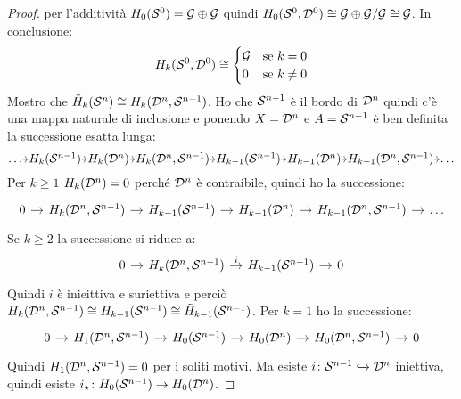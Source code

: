 \begin{proof}
  per l'additività $ H_0(\mathcal{S}^{0}) = \mathcal{G} \oplus \mathcal{G} $ quindi
  $ H_0(\mathcal{S}^{0}, \mathcal{D}^{0}) \cong {\mathcal{G} \oplus \mathcal{G}} \slash {\mathcal{G}} \cong \mathcal{G} $.
  In conclusione:
  \[
    H_k(\mathcal{S}^{0}, \mathcal{D}^{0}) \cong
    \begin{cases}
      \mathcal{G} & \text{se } k = 0 \\
      0 & \text{se } k \not =  0
    \end{cases}
  \]
  Mostro che $ \tilde{H}_k(\mathcal{S}^{n}) \cong H_k(\mathcal{D}^{n}, \mathcal{S}^{n-1}) $.
  Ho che $ \mathcal{S}^{n-1} $ è il bordo di $ \mathcal{D}^{n} $ quindi c'è una mappa naturale di inclusione
  e ponendo $ X = \mathcal{D}^{n} $ e $ A = \mathcal{S}^{n-1} $ è ben definita la successione esatta lunga:
  \[
    \begin{tikzcd}[nodes={column sep=4.5pt, inner sep=0.5pt}]
      \dots \rar & H_k(\Sph{n-1}) \rar & H_k(\Disk{n}) \rar & H_k(\Disk{n}, \Sph{n-1}) \rar
      & H_{k-1}(\Sph{n-1}) \rar & H_{k-1}(\Disk{n}) \rar & H_{k-1}(\Disk{n}, \Sph{n-1}) \rar & \dots
    \end{tikzcd}
  \]
  Per $ k \geq 1 $ $ H_k(\mathcal{D}^{n}) = 0 $ perché $ \mathcal{D}^{n} $ è contraibile, quindi ho la successione:
  \[
    \begin{tikzcd}[nodes={column sep=10pt}]
      0 \rar & H_k(\Disk{n}, \Sph{n-1}) \rar & H_{k-1}(\Sph{n-1}) \rar & H_{k-1}(\Disk{n}) \rar & H_{k-1}(\Disk{n}, \Sph{n-1}) \rar & \dots
    \end{tikzcd}
  \]
  Se $ k \geq 2 $ la successione si riduce a:
  \[
    \begin{tikzcd}[nodes={column sep=10pt}]
      0 \rar & H_k(\Disk{n}, \Sph{n-1}) \rar{i} & H_{k-1}(\Sph{n-1}) \rar & 0
    \end{tikzcd}
  \]
  Quindi $ i $ è inieittiva e suriettiva e perciò
  $ H_k(\mathcal{D}^{n}, \mathcal{S}^{n-1}) \cong H_{k-1}(\mathcal{S}^{n-1}) \cong \tilde{H}_{k-1}(\mathcal{S}^{n-1}) $.
  Per $ k = 1 $ ho la successione:
  \[
    \begin{tikzcd}[nodes={column sep=10pt}]
      0 \rar & H_1(\Disk{n}, \Sph{n-1}) \rar & H_0(\Sph{n-1}) \rar & H_0(\Disk{n}) \rar & H_0(\Disk{n}, \Sph{n-1}) \rar & 0
    \end{tikzcd}
  \]
  Quindi $ H_1(\mathcal{D}^{n}, \mathcal{S}^{n-1}) = 0 $ per i soliti motivi.
  Ma esiste $ i \colon \mathcal{S}^{n-1} \xhookrightarrow{} \mathcal{D}^{n} $ iniettiva, quindi esiste $ i_\star \colon H_0(\mathcal{S}^{n-1}) \to H_0(\mathcal{D}^{n}) $.

\end{proof}
